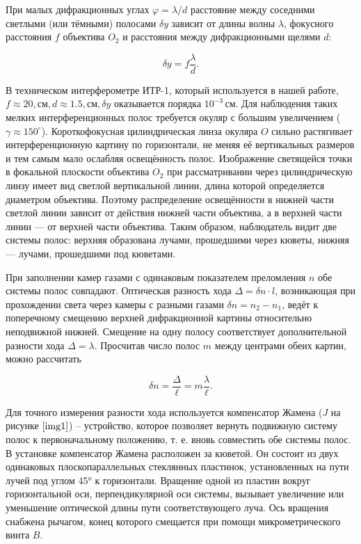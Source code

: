\documentclass[a4paper,12pt]{article} %
\begin{document}
При малых дифракционных углах $\varphi = \lambda / d$ расстояние между соседними светлыми (или тёмными) полосами $\delta y$ зависит от длины волны $\lambda$, фокусного расстояния $f$ объектива $O_2$ и расстояния между дифракционными щелями $d$:

\[ \delta y = f \frac{\lambda}{d}. \]

В техническом интерферометре ИТР-1, который используется в нашей работе, $f \approx 20, \text{см}, d \approx 1.5, \text{см}, \delta y$  оказывается порядка $10^{-3} \, \text{см}$. Для наблюдения таких мелких интерференционных полос требуется окуляр с большим увеличением ($\gamma \approx 150^\circ$). Короткофокусная цилиндрическая линза окуляра $O$ сильно растягивает интерференционную картину по горизонтали, не меняя её вертикальных размеров и тем самым мало ослабляя освещённость полос. Изображение светящейся точки в фокальной плоскости объектива $O_2$ при рассматривании через цилиндрическую линзу имеет вид светлой вертикальной линии, длина которой определяется диаметром объектива. Поэтому распределение освещённости в нижней части светлой линии зависит от действия нижней части объектива, а в верхней части линии — от верхней части объектива. Таким образом, наблюдатель видит две системы полос: верхняя образована лучами, прошедшими через кюветы, нижняя — лучами, прошедшими под кюветами.

При заполнении камер газами с одинаковым показателем преломления $n$ обе системы полос совпадают. Оптическая разность хода $\Delta = \delta n \cdot l$, возникающая при прохождении света через камеры с разными газами $\delta n = n_2 - n_1$, ведёт к поперечному смещению верхней дифракционной картины относительно неподвижной нижней. Смещение на одну полосу соответствует дополнительной разности хода $\Delta = \lambda$. Просчитав число полос $m$ между центрами обеих картин, можно рассчитать

\[ \delta n = \frac{\Delta}{\ell} = m \frac{\lambda}{\ell}. \]

Для точного измерения разности хода используется компенсатор Жамена ($J$ на рисунке $\ref{img1}$) -- устройство, которое позволяет вернуть подвижную систему полос к первоначальному положению, т. е. вновь совместить обе системы полос. В установке компенсатор Жамена расположен за кюветой. Он состоит из двух одинаковых плоскопараллельных стеклянных пластинок, установленных на пути лучей под углом 45° к горизонтали. Вращение одной из пластин вокруг горизонтальной оси, перпендикулярной оси системы, вызывает увеличение или уменьшение оптической длины пути соответствующего луча. Ось вращения снабжена рычагом, конец которого смещается при помощи микрометрического винта $B$.
\end{document}
